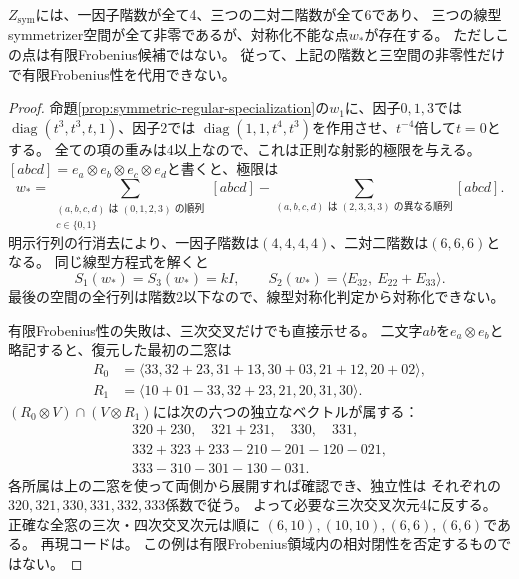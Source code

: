 \begin{proposition}[全ての二対二階数を保つ非Frobenius境界]\label{prop:singular-symmetrizer-boundary}
$Z_{\mathrm{sym}}$には、一因子階数が全て4、三つの二対二階数が全て6であり、
三つの線型symmetrizer空間が全て非零であるが、対称化不能な点$w_*$が存在する。
ただしこの点は有限Frobenius候補ではない。
従って、上記の階数と三空間の非零性だけで有限Frobenius性を代用できない。
\end{proposition}
\begin{proof}
命題\ref{prop:symmetric-regular-specialization}の$w_1$に、因子$0,1,3$では
$\operatorname{diag}(t^3,t^3,t,1)$、因子2では
$\operatorname{diag}(1,1,t^4,t^3)$を作用させ、$t^{-4}$倍して$t=0$とする。
全ての項の重みは4以上なので、これは正則な射影的極限を与える。
$[a b c d]=e_a\otimes e_b\otimes e_c\otimes e_d$と書くと、極限は
\[
 w_* =\sum_{\substack{(a,b,c,d)\text{ は }(0,1,2,3)\text{ の順列}\\ c\in\{0,1\}}}[a b c d]
       -\sum_{(a,b,c,d)\text{ は }(2,3,3,3)\text{ の異なる順列}}[a b c d].
\]
明示行列の行消去により、一因子階数は$(4,4,4,4)$、二対二階数は$(6,6,6)$となる。
同じ線型方程式を解くと
\[
 S_1(w_*)=S_3(w_*)=kI,\qquad
 S_2(w_*)=\langle E_{32},\ E_{22}+E_{33}\rangle.
\]
最後の空間の全行列は階数2以下なので、線型対称化判定から対称化できない。

有限Frobenius性の失敗は、三次交叉だけでも直接示せる。
二文字$ab$を$e_a\otimes e_b$と略記すると、復元した最初の二窓は
\begin{align*}
 R_0&=\langle33,32+23,31+13,30+03,21+12,20+02\rangle,\\
 R_1&=\langle10+01-33,32+23,21,20,31,30\rangle.
\end{align*}
$(R_0\otimes V)\cap(V\otimes R_1)$には次の六つの独立なベクトルが属する：
\begin{gather*}
320+230,\quad321+231,\quad330,\quad331,\\
332+323+233-210-201-120-021,\\
333-310-301-130-031.
\end{gather*}
各所属は上の二窓を使って両側から展開すれば確認でき、独立性は
それぞれの$320,321,330,\allowbreak331,332,333$係数で従う。
よって必要な三次交叉次元4に反する。
正確な全窓の三次・四次交叉次元は順に
$(6,10),(10,10),(6,6),(6,6)$である。
再現コードは。
この例は有限Frobenius領域内の相対閉性を否定するものではない。
\end{proof}
